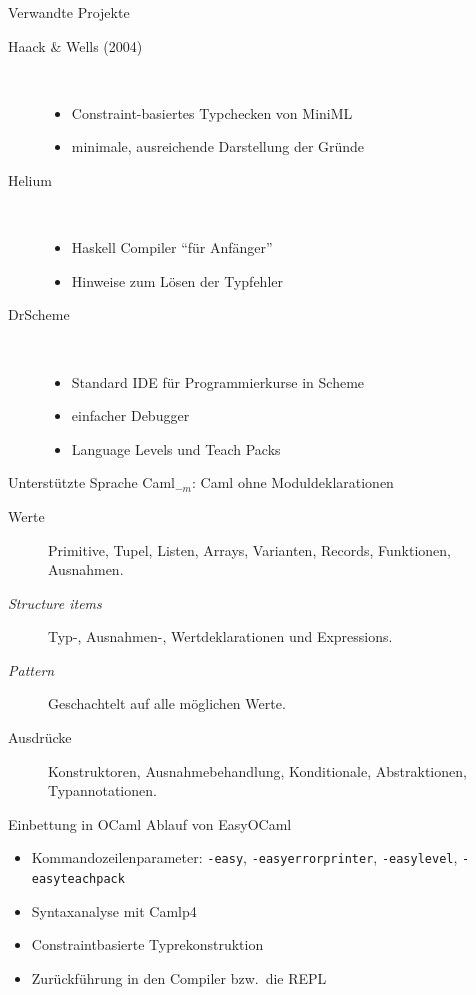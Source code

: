 \documentclass{beamer}
\begin{document}
\begin{frame}{Verwandte Projekte}
  \begin{description}
    \item[Haack \& Wells (2004)]\ \\
      \begin{itemize}
        \item Constraint-basiertes Typchecken von MiniML
        \item minimale, ausreichende Darstellung der Gründe
      \end{itemize}
    \item[Helium]\ \\
      \begin{itemize}
        \item Haskell Compiler ``für Anfänger''
        \item Hinweise zum Lösen der Typfehler
      \end{itemize}
    \item[DrScheme]\ \\
      \begin{itemize}
        \item Standard IDE für Programmierkurse in Scheme
        \item einfacher Debugger
        \item Language Levels und Teach Packs
      \end{itemize}
  \end{description}
\end{frame}

\begin{frame}{Unterstützte Sprache}
  Caml$_{-m}$: Caml ohne Moduldeklarationen
  \begin{description}
    \item[Werte]
      Primitive, Tupel, Listen, Arrays, Varianten, Records, Funktionen, Ausnahmen.
    \item[\emph{Structure items}]
      Typ-, Ausnahmen-, Wertdeklarationen und Expressions.
    \item[\emph{Pattern}]
      Geschachtelt auf alle möglichen Werte.
    \item[Ausdrücke]
      Konstruktoren, Ausnahmebehandlung, Konditionale, Abstraktionen, Typannotationen.
  \end{description}
\end{frame}

\begin{frame}{Einbettung in OCaml}
  Ablauf von EasyOCaml
  \begin{itemize}
    \item Kommandozeilenparameter: \texttt{-easy}, \texttt{-easyerrorprinter},
      \texttt{-easylevel}, \texttt{-easyteachpack}
    \item Syntaxanalyse mit Camlp4
    \item Constraintbasierte Typrekonstruktion
    \item Zurückführung in den Compiler bzw.\ die REPL
  \end{itemize}
\end{frame}
\end{document}
